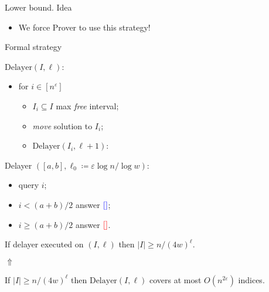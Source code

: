 \begin{frame}{Lower bound. Idea}

    

    \pause
    \pause
    \pause
    \pause
    \pause
    \pause
    \pause
    \pause
    \begin{itemize}
        \item We force Prover to use this strategy!
    \end{itemize}

\end{frame}

\begin{frame}{Formal strategy}

    \begin{minipage}[c]{0.45\linewidth}
        $\text{Delayer}(I, \ell)$:
        \begin{itemize}
            \item for $i \in [n^{\varepsilon}]$
                \begin{itemize}
                    \item $I_i \subseteq I$ max \emph{free} interval;
                    \item \emph{move} solution to $I_i$;
                    \item $\text{Delayer}(I_i, \ell + 1)$:                        
                \end{itemize}
        \end{itemize}        
    \end{minipage}
    \begin{minipage}[c]{0.45\linewidth}
        Delayer $([a, b], \ell_0 \coloneqq \varepsilon \log n / \log w)$:
        \begin{itemize}
            \item query $i$;
            \item $i < (a + b) / 2$ answer $\textcolor{blue}{[]}$;
            \item $i \ge (a + b) / 2$ answer $\textcolor{red}{[]}$.
        \end{itemize}        
    \end{minipage}

    \pause
    \begin{lemma}
        If delayer executed on $(I, \ell)$ then $|I| \ge n / (4w)^{\ell}$.
        \pause
        \begin{center}
            $\Uparrow$
        \end{center}
        If $|I| \ge n / (4w)^{\ell}$ then $\text{Delayer}(I, \ell)$ covers at most $O(n^{2 \varepsilon})$
        indices.
    \end{lemma}
    
\end{frame}